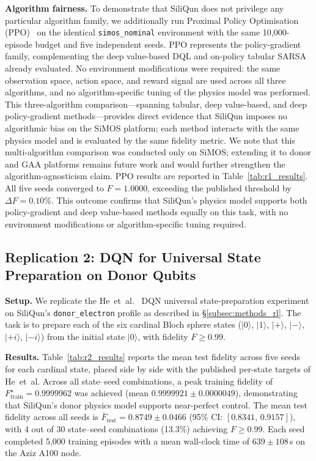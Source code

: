 \textbf{Algorithm fairness.} To demonstrate that SiliQun does not privilege any particular algorithm family, we additionally run Proximal Policy Optimisation (PPO)~\cite{Schulman2017} on the identical \texttt{simos\_nominal} environment with the same 10{,}000-episode budget and five independent seeds. PPO represents the policy-gradient family, complementing the deep value-based DQL and on-policy tabular SARSA already evaluated. No environment modifications were required: the same observation space, action space, and reward signal are used across all three algorithms, and no algorithm-specific tuning of the physics model was performed. This three-algorithm comparison---spanning tabular, deep value-based, and deep policy-gradient methods---provides direct evidence that SiliQun imposes no algorithmic bias on the SiMOS platform; each method interacts with the same physics model and is evaluated by the same fidelity metric. We note that this multi-algorithm comparison was conducted only on SiMOS; extending it to donor and GAA platforms remains future work and would further strengthen the algorithm-agnosticism claim. PPO results are reported in Table~\ref{tab:r1_results}. All five seeds converged to $F = 1.0000$, exceeding the published threshold by $\Delta F = 0.10\%$. This outcome confirms that SiliQun's physics model supports both policy-gradient and deep value-based methods equally on this task, with no environment modifications or algorithm-specific tuning required.

\subsection{Replication 2: DQN for Universal State Preparation on Donor Qubits}
\label{subsec:r2_results}

\textbf{Setup.} We replicate the He~et~al.~\cite{He2021} DQN universal state-preparation experiment on SiliQun's \texttt{donor\_electron} profile as described in \S\ref{subsec:methods_rl}. The task is to prepare each of the six cardinal Bloch sphere states ($|0\rangle$, $|1\rangle$, $|+\rangle$, $|-\rangle$, $|+i\rangle$, $|-i\rangle$) from the initial state $|0\rangle$, with fidelity $F \geq 0.99$.

\textbf{Results.} Table~\ref{tab:r2_results} reports the mean test fidelity across five seeds for each cardinal state, placed side by side with the published per-state targets of He~et~al. Across all state--seed combinations, a peak training fidelity of $F_\text{train}^\star = 0.9999962$ was achieved (mean $0.9999921 \pm 0.0000049$), demonstrating that SiliQun's donor physics model supports near-perfect control. The mean test fidelity across all seeds is $\bar{F}_\text{test} = 0.8749 \pm 0.0466$ (95\% CI: $[0.8341,\,0.9157]$), with 4 out of 30 state--seed combinations (13.3\%) achieving $F \geq 0.99$. Each seed completed 5{,}000 training episodes with a mean wall-clock time of $639 \pm 108$\,s on the Aziz A100 node.

